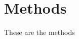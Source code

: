 \documentclass[../main.tex]{subfiles}
\begin{document}
\section{Methods}

These are the methods
\end{document}
